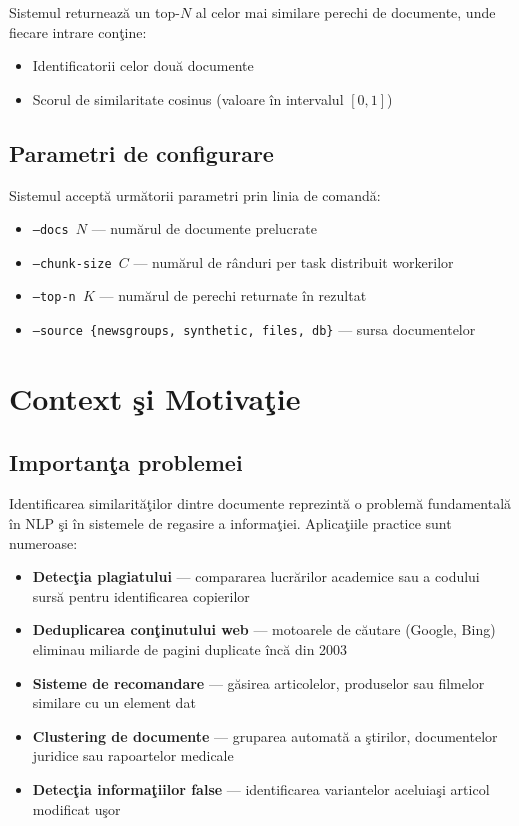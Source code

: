 \documentclass[a4paper,12pt]{report}
\begin{document}
Sistemul returneaz\u{a} un top-$N$ al celor mai similare perechi de documente, unde fiecare intrare con\c{t}ine:
\begin{itemize}
  \item Identificatorii celor dou\u{a} documente
  \item Scorul de similaritate cosinus (valoare \^{i}n intervalul $[0, 1]$)
\end{itemize}

\section{Parametri de configurare}

Sistemul accept\u{a} urm\u{a}torii parametri prin linia de comand\u{a}:
\begin{itemize}
  \item \texttt{--docs $N$} — num\u{a}rul de documente prelucrate
  \item \texttt{--chunk-size $C$} — num\u{a}rul de r\^{a}nduri per task distribuit workerilor
  \item \texttt{--top-n $K$} — num\u{a}rul de perechi returnate \^{i}n rezultat
  \item \texttt{--source \{newsgroups, synthetic, files, db\}} — sursa documentelor
\end{itemize}

\chapter{Context \c{s}i Motiva\c{t}ie}

\section{Importan\c{t}a problemei}

Identificarea similarit\u{a}\c{t}ilor dintre documente reprezint\u{a} o problem\u{a} fundamental\u{a} \^{i}n \ac{NLP} \c{s}i \^{i}n sistemele de regasire a informa\c{t}iei. Aplica\c{t}iile practice sunt numeroase:

\begin{itemize}
  \item \textbf{Detec\c{t}ia plagiatului} — compararea lucr\u{a}rilor academice sau a codului surs\u{a} pentru identificarea copierilor
  \item \textbf{Deduplicarea con\c{t}inutului web} — motoarele de c\u{a}utare (Google, Bing) eliminau miliarde de pagini duplicate \^{i}nc\u{a} din 2003
  \item \textbf{Sisteme de recomandare} — g\u{a}sirea articolelor, produselor sau filmelor similare cu un element dat
  \item \textbf{Clustering de documente} — gruparea automat\u{a} a \c{s}tirilor, documentelor juridice sau rapoartelor medicale
  \item \textbf{Detec\c{t}ia informa\c{t}iilor false} — identificarea variantelor aceluia\c{s}i articol modificat u\c{s}or
\end{itemize}
\end{document}
